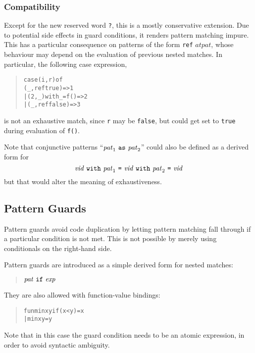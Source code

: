 \documentclass[twoside,titlepage]{article}
\newcommand{\void}[1]{}
\begin{document}
\begin{appendix}
\subsubsection*{Compatibility}

Except for the new reserved word {\tt?}, this is a mostly conservative extension.
Due to potential side effects in guard conditions, it renders pattern matching impure. This has a particular consequence on patterns of the form {\tt ref} $\mathit{atpat}$, whose behaviour may depend on the evaluation of previous nested matches. In particular, the following case expression,
\begin{quote}
\begin{alltt}
case (i, r) of
    (\_, ref true) => 1
  | (2, \_) with _ = f() => 2
  | (\_, ref false) => 3
\end{alltt}
\end{quote}
is not an exhaustive match, since {\tt r} may be {\tt false}, but could get set to {\tt true} during evaluation of {\tt f()}.

Note that conjunctive patterns ``$\mathit{pat}_1~{\tt{as}}~\mathit{pat}_2$'' could also be defined as a derived form for
$$
\mathit{vid}~{\tt{with}}~\mathit{pat}_1~\mbox{\tt=}~\mathit{vid}~{\tt{with}}~\mathit{pat}_2~\mbox{\tt=}~\mathit{vid}
$$
but that would alter the meaning of exhaustiveness.


\subsection{Pattern Guards}
\label{ext-guards}

Pattern guards avoid code duplication by letting pattern matching fall through if a particular condition is not met. This is not possible by merely using conditionals on the right-hand side.

Pattern guards are introduced as a simple derived form for nested matches:
\begin{quote}
$\mathit{pat}~{\tt{if}}~\mathit{exp}$
\end{quote}
They are also allowed with function-value bindings:
\begin{quote}
\begin{alltt}
fun min x y if (x < y) = x
  | min x y            = y
\end{alltt}
\end{quote}
\void{
\begin{quote}
$\langle{\tt{op}}\rangle\mathit{vid}~\mathit{atpat}_1\cdots\mathit{atpat}_n~{\tt{if}}~\mathit{atexp}~\mbox{\tt=}~\mathit{exp}$
\end{quote}
}Note that in this case the guard condition needs to be an atomic expression, in order to avoid syntactic ambiguity.


\end{appendix}
\end{document}
